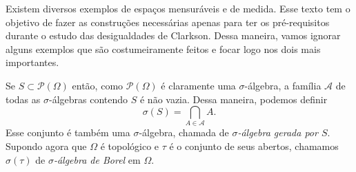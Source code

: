 \documentclass{article}
\begin{document}
Existem diversos exemplos de espaços mensuráveis e de medida. Esse texto tem o objetivo de fazer as construções necessárias apenas para ter os pré-requisitos durante o estudo das desigualdades de Clarkson. Dessa maneira, vamos ignorar alguns exemplos que são costumeiramente feitos e focar logo nos dois mais importantes.

Se $S \subset \mathcal{P}(\Omega)$ então, como $\mathcal{P}(\Omega)$ é claramente uma $\sigma$-álgebra, a família $\mathcal{A}$ de todas as $\sigma$-álgebras contendo $S$ é não vazia. Dessa maneira, podemos definir $$\sigma(S) = \bigcap_{A \in \mathcal{A}} A.$$ Esse conjunto é também uma $\sigma$-álgebra, chamada de \textit{$\sigma$-álgebra gerada por $S$}. Supondo agora que $\Omega$ é topológico e $\tau$ é o conjunto de seus abertos, chamamos $\sigma(\tau)$ de \textit{$\sigma$-álgebra de Borel} em $\Omega$.

\nocite{*}
\printbibliography
\end{document}
